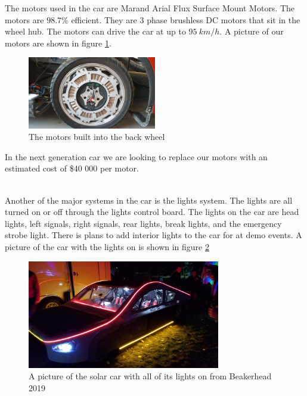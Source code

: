 \documentclass[titlepage]{article}
\begin{document}
    The motors used in the car are Marand Arial Flux Surface Mount
    Motors. The motors are $98.7\%$ efficient. They are 3 phase
    brushless DC motors that sit in the wheel hub. The motors can drive
    the car at up to $95\ km/h$. A picture of our motors are shown in
    figure \ref{fig:motor}.
    \begin{figure}[H]
        \centering
        \includegraphics[width=0.5\textwidth]{images/motor.jpg}
        \caption{The motors built into the back wheel}
        \label{fig:motor}
    \end{figure}
    \noindent In the next generation car we are looking to replace our
    motors with an estimated cost of \$40 000 per motor.\\\\
    \par Another of the major systems in the car is the lights system.
    The lights are all turned on or off through the lights control board.
    The lights on the car are head lights, left signals, right signals,
    rear lights, break lights, and the emergency strobe light. There is
    plans to add interior lights to the car for at demo events. A
    picture of the car with the lights on is shown in figure
    \ref{fig:lights}
    \begin{figure}[H]
        \centering
        \includegraphics[width=0.75\textwidth]{images/lights.jpg}
        \caption{A picture of the solar car with all of its lights on
        from Beakerhead 2019}
        \label{fig:lights}
    \end{figure}
\end{document}
